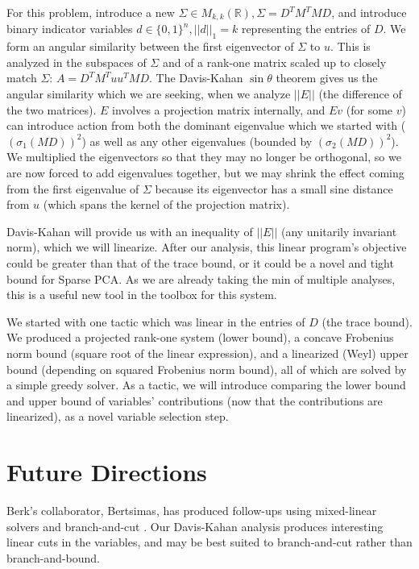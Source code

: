\documentclass{article}
\begin{document}
For this problem, introduce a new $\Sigma \in M_{k,k}(\mathbb{R}), \Sigma = D^T M^T MD$, and introduce binary indicator variables $d \in \{0,1\}^n, ||d||_1 = k$ representing the entries of $D$. We form an angular similarity between the first eigenvector of $\Sigma$ to $u$. This is analyzed in the subspaces of $\Sigma$ and of a rank-one matrix scaled up to closely match $\Sigma$: $A = D^T M^T uu^T MD$. The Davis-Kahan $\sin\theta$ theorem \cite{davis1970rotation} gives us the angular similarity which we are seeking, when we analyze $||E||$ (the difference of the two matrices). $E$ involves a projection matrix internally, and $Ev$ (for some $v$) can introduce action from both the dominant eigenvalue which we started with ($\left(\sigma_1(MD)\right)^2$) as well as any other eigenvalues (bounded by $\left(\sigma_2(MD)\right)^2$). We multiplied the eigenvectors so that they may no longer be orthogonal, so we are now forced to add eigenvalues together, but we may shrink the effect coming from the first eigenvalue of $\Sigma$ because its eigenvector has a small sine distance from $u$ (which spans the kernel of the projection matrix).

Davis-Kahan will provide us with an inequality of $||E||$ (any unitarily invariant norm), which we will linearize. After our analysis, this linear program's objective could be greater than that of the trace bound, or it could be a novel and tight bound for Sparse PCA. As we are already taking the min of multiple analyses, this is a useful new tool in the toolbox for this system.

We started with one tactic which was linear in the entries of $D$ (the trace bound). We produced a projected rank-one system (lower bound), a concave Frobenius norm bound (square root of the linear expression), and a linearized (Weyl) upper bound (depending on squared Frobenius norm bound), all of which are solved by a simple greedy solver. As a tactic, we will introduce comparing the lower bound and upper bound of variables' contributions (now that the contributions are linearized), as a novel variable selection step.

\section{Future Directions}

Berk's collaborator, Bertsimas, has produced follow-ups using mixed-linear solvers and branch-and-cut \cite{bertsimas2022solving}. Our Davis-Kahan analysis produces interesting linear cuts in the variables, and may be best suited to branch-and-cut rather than branch-and-bound.
\end{document}
